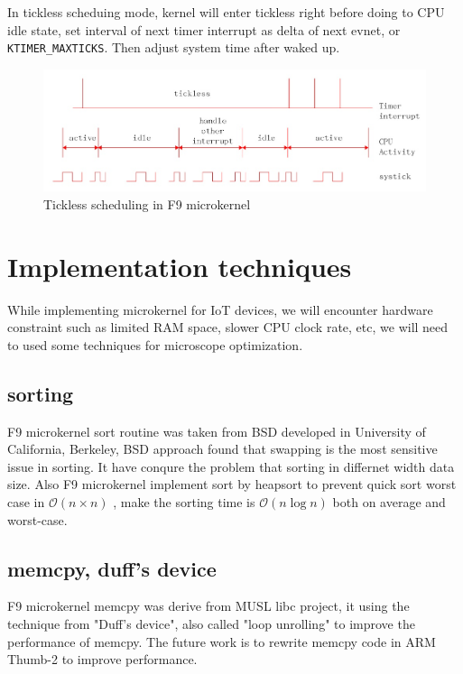 \documentclass[10pt,preprint,nocopyrightspace]{sigplanconf}
\begin{document}
In tickless scheduing mode, kernel will enter tickless right before doing to CPU idle state, set interval of next timer interrupt as delta of next evnet, or \verb|KTIMER_MAXTICKS|. Then adjust system time after waked up.

\begin{figure}[H]
	\begin{center}
		\includegraphics[width=\linewidth]{picture/tickless.png}
	\end{center}
	\caption{Tickless scheduling in F9 microkernel}
\end{figure}

\section{Implementation techniques}

While implementing microkernel for IoT devices, we will encounter hardware constraint such as limited RAM space, slower CPU clock rate, etc, we will need to used some techniques for microscope optimization.

\subsection{sorting}
F9 microkernel sort routine was taken from BSD\cite{bentley1993engineering} developed in University of California, Berkeley, BSD approach found that swapping is the most sensitive issue in sorting. It have conqure the problem that sorting in differnet width data size. Also F9 microkernel implement sort by heapsort to prevent quick sort worst case in $\mathcal{O}(n \times n)$ , make the sorting time is $\mathcal{O}(n\log{}n)$  both on average and worst-case.

\subsection{memcpy, duff's device}
F9 microkernel memcpy was derive from MUSL libc project\cite{felker}, it using the technique from "Duff's device", also called "loop unrolling" to improve the performance of memcpy. The future work is to rewrite memcpy code in ARM Thumb-2 to improve performance.
\end{document}

